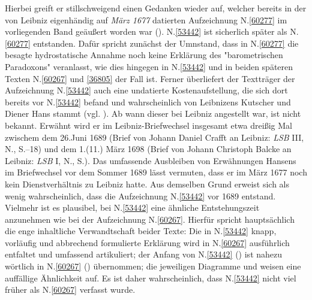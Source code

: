 Hierbei greift er stillschweigend einen Gedanken wieder auf, welcher bereits in der von Leibniz eigenhändig auf \textit{März 1677} datierten Aufzeichnung N.\;\ref{60277} im vorliegenden Band geäußert worden war ().
N.\;\ref{53442} ist sicherlich später als N.\;\ref{60277} entstanden.
Dafür spricht zunächst der Umnstand, dass in N.\;\ref{60277} die besagte hydrostatische Annahme noch keine Erklärung des "barometrischen Paradoxons" veranlasst, wie dies hingegen in N.\;\ref{53442} und in beiden späteren Texten N.\;\ref{60267} und \ref{36805} der Fall ist. %
Ferner überliefert der Textträger der Aufzeichnung N.\;\ref{53442} auch eine undatierte Kostenaufstellung, die sich dort bereits vor N.\;\ref{53442} befand und wahrscheinlich von Leibnizens Kutscher und Diener Hans stammt (vgl. ). %
Ab wann dieser bei Leibniz angestellt war, ist nicht bekannt.
Erwähnt wird er %
im Leibniz-Briefwechsel insgesamt etwa dreißig Mal zwischem dem 26.\;Juni 1689 (Brief von Johann Daniel Crafft an Leibniz: \textit{LSB} III, N., S.--18)\cite{02575} und dem 1.\;(11.) März 1698 (Brief von Johann Christoph Balcke an Leibniz: \textit{LSB} I, N., S.)\cite{02576}.
Das umfassende Ausbleiben von Erwähnungen Hansens im Briefwechsel vor dem Sommer 1689 lässt vermuten, dass er im März 1677 noch kein Dienstverhältnis zu Leibniz hatte.
Aus demselben Grund erweist sich als wenig wahrscheinlich, dass die Aufzeichnung N.\;\ref{53442} vor 1689 entstand.
Vielmehr ist es plausibel, bei N.\;\ref{53442} eine ähnliche Entstehungszeit anzunehmen wie bei der Aufzeichnung N.\;\ref{60267}.
Hierfür spricht hauptsächlich die enge inhaltliche Verwandtschaft beider Texte:
Die in N.\;\ref{53442} knapp, vorläufig und abbrechend formulierte Erklärung wird in N.\;\ref{60267} ausführlich entfaltet und umfassend artikuliert;
der Anfang von N.\;\ref{53442} () ist nahezu wörtlich in N.\;\ref{60267} () übernommen;
die jeweiligen Diagramme  und  weisen eine auffällige Ähnlichkeit auf.
Es ist daher wahrscheinlich, dass N.\;\ref{53442} nicht viel früher als N.\;\ref{60267} verfasst wurde.
